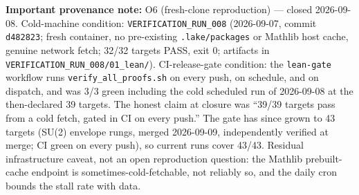 \documentclass[aps,prd,preprint,superscriptaddress,nofootinbib,amsmath,amssymb,floatfix]{revtex4-2}
\begin{document}
\textbf{Important provenance note:} O6 (fresh-clone reproduction) --- closed 2026-09-08. Cold-machine condition: \texttt{VERIFICATION\_RUN\_008} (2026-09-07, commit \texttt{d482823}; fresh container, no pre-existing \texttt{.lake/packages} or Mathlib host cache, genuine network fetch; 32/32 targets PASS, exit 0; artifacts in \texttt{VERIFICATION\_RUN\_008/01\_lean/}). CI-release-gate condition: the \texttt{lean-gate} workflow runs \texttt{verify\_all\_proofs.sh} on every push, on schedule, and on dispatch, and was 3/3 green including the cold scheduled run of 2026-09-08 at the then-declared 39 targets. The honest claim at closure was ``39/39 targets pass from a cold fetch, gated in CI on every push.'' The gate has since grown to 43 targets (SU(2) envelope rungs, merged 2026-09-09, independently verified at merge; CI green on every push), so current runs cover 43/43. Residual infrastructure caveat, not an open reproduction question: the Mathlib prebuilt-cache endpoint is sometimes-cold-fetchable, not reliably so, and the daily cron bounds the stall rate with data.
\end{document}
